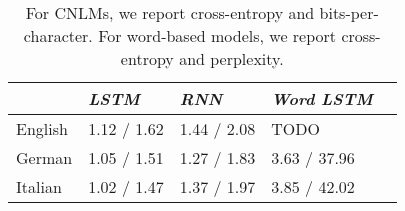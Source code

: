 
\begin{table}[t]
  \begin{center}
    \begin{tabular}{l|l|l|l|l}
      \multicolumn{1}{c}{}&\emph{LSTM}&\emph{RNN}&\emph{Word LSTM}\\
      \hline
	    English & 1.12 / 1.62 & 1.44 / 2.08 & TODO  \\
	    German &  1.05 / 1.51 & 1.27 / 1.83 & 3.63 / 37.96   \\
	    Italian & 1.02 / 1.47 & 1.37 / 1.97 & 3.85 / 42.02  \\
    \end{tabular}
  \end{center}
  \caption{\label{tab:lm-results} For CNLMs, we report cross-entropy and bits-per-character. For word-based models, we report cross-entropy and perplexity.}
\end{table}




